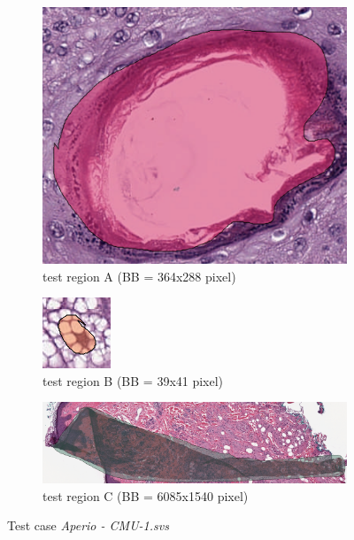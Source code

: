 \begin{figure}[H]
	\begin{subfigure}{.6\textwidth}
		\centering
		\includegraphics[width=.8\linewidth]{img/ts_test/region1.png}
		\caption{test region A (BB = 364x288 pixel)}
		\label{fig5_sample:1}
	\end{subfigure}%
	\begin{subfigure}{.2\textwidth}
		\centering
		\includegraphics[width=.8\linewidth]{img/ts_test/region3.png}
		\caption{test region B (BB = 39x41 pixel)}
		\label{fig5_sample:3}
	\end{subfigure}
	\begin{subfigure}{1\textwidth}
		\centering
		\includegraphics[width=1\linewidth]{img/ts_test/region2.png}
		\caption{test region C (BB = 6085x1540 pixel)}
		\label{fig5_sample:2}
	\end{subfigure}
	\caption{Test case \emph{Aperio - CMU-1.svs}}
	\label{fig5_sample}
\end{figure}


